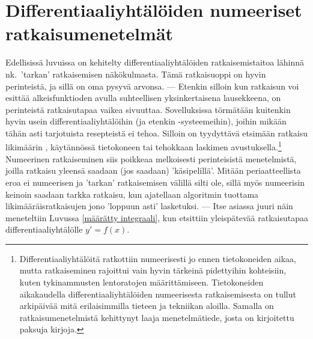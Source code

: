 \section[Differentiaaliyhtälöiden numeeriset ratkaisumenetelmät]{Differentiaaliyhtälöiden
numeeriset \\ ratkaisumenetelmät} 
\label{DYn numeeriset menetelmät}
\alku
{}

Edellisissä luvuissa on kehitelty differentiaaliyhtälöiden ratkaisemistaitoa lähinnä nk.\
'tarkan' ratkaisemisen näkökulmasta. Tämä ratkaisuoppi on hyvin perinteistä, ja sillä on oma
pysyvä arvonsa. --- Etenkin silloin kun ratkaisun voi esittää alkeisfunktioden avulla 
suhteellisen yksinkertaisena lausekkeena, on perinteistä ratkaisutapaa vaikea sivuuttaa. 
Sovelluksissa törmätään kuitenkin hyvin usein differentiaaliyhtälöihin (ja etenkin 
-systeemeihin), joihin mikään tähän asti tarjotuista resepteistä ei tehoa. Silloin on tyydyttävä
etsimään ratkaisu likimäärin \kor{numeerisesti}, käytännössä tietokoneen tai tehokkaan 
laskimen avustuksella.\footnote[2]{Differentiaaliyhtälöitä ratkottiin numeerisesti jo ennen 
tietokoneiden aikaa, mutta ratkaiseminen rajoittui vain hyvin tärkeinä pidettyihin kohteisiin,
kuten tykinammusten lentoratojen määrittämiseen. Tietokoneiden aikakaudella 
differentiaaliyhtälöiden numeerisesta ratkaisemisesta on tullut arkipäivää mitä erilaisimmilla
tieteen ja tekniikan aloilla. Samalla on ratkaisumenetelmistä kehittynyt laaja menetelmätiede,
josta on kirjoitettu paksuja kirjoja.} Numeerinen ratkaiseminen siis poikkeaa melkoisesti
perinteisistä menetelmistä, joilla ratkaisu yleensä saadaan (jos saadaan) 'käsipelillä'. 
Mitään periaatteellista eroa ei numeerisen ja 'tarkan' ratkaisemisen välillä silti ole, sillä
myös numeerisin keinoin saadaan tarkka ratkaisu, kun ajatellaan algoritmin tuottama 
likimääräisratkaisujen jono 'loppuun asti' lasketuksi. --- Itse asiassa juuri näin meneteltiin
Luvussa \ref{määrätty integraali}, kun etsittiin yleispätevää ratkaisutapaa 
differentiaaliyhtälölle $y'=f(x)$.

